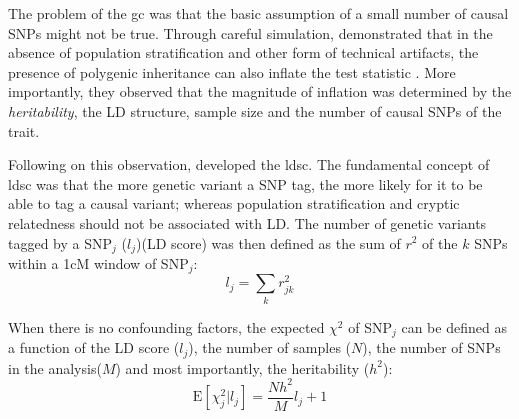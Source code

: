 	The problem of the \gls{gc} was that the basic assumption of a small number of causal \glspl{SNP} might not be true. 
	Through careful simulation, \citet{Yang2011b} demonstrated that in the absence of population stratification and other form of technical artifacts, the presence of polygenic inheritance can also inflate the test statistic \citep{Yang2011b}.
	More importantly, they observed that the magnitude of inflation was determined by the \emph{heritability}, the \gls{LD} structure, sample size and the number of causal \glspl{SNP} of the trait.

	Following on this observation, \citet{Bulik-Sullivan2015} developed the \gls{ldsc}.
	The fundamental concept of \gls{ldsc} was that the more genetic variant a \gls{SNP} tag, the more likely for it to be able to tag a causal variant; 
	whereas population stratification and cryptic relatedness should not be associated with \gls{LD}. 
	The number of genetic variants tagged by a \gls{SNP}$_j$ ($l_j$)(\gls{LD} score) was then defined as the sum of $r^2$ of the $k$ \glspl{SNP} within a 1cM window of \gls{SNP}$_j$:
	\begin{equation}
	l_j = \sum_kr^2_{jk}
	\label{eq:ldScore}
	\end{equation}
	
	When there is no confounding factors, the expected $\chi^2$ of \gls{SNP}$_j$ can be defined as a function of the \gls{LD} score ($l_j$), the number of samples ($N$), the number of \glspl{SNP} in the analysis($M$) and most importantly, the heritability ($h^2$):
	\begin{equation}
	\mathrm{E}[\chi^2_j | l_j] = \frac{Nh^2}{M}l_j+1
	\label{eq:fixedLDSC}
	\end{equation}

